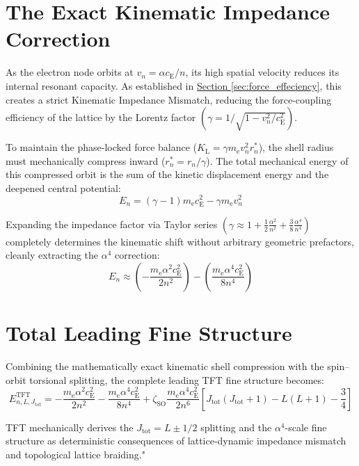 \section{The Exact Kinematic Impedance Correction}
As the electron node orbits at $v_n = \alpha c_{\mathrm{E}} / n$, its high spatial velocity reduces its internal resonant capacity. As established in \hyperref[sec:force_effeciency]{Section \ref*{sec:force_effeciency}}, this creates a strict Kinematic Impedance Mismatch, reducing the force-coupling efficiency of the lattice by the Lorentz factor $\left( \gamma = 1/\sqrt{1 - v_n^2/c_{\mathrm{E}}^2} \right)$. 

To maintain the phase-locked force balance ($K_{\mathrm{L}} = \gamma m_{\mathrm{e}} v_n^2 r_n^*$), the shell radius must mechanically compress inward ($r_n^* = r_n / \gamma$). The total mechanical energy of this compressed orbit is the sum of the kinetic displacement energy and the deepened central potential:
\begin{equation}
    E_n = (\gamma - 1)m_{\mathrm{e}} c_{\mathrm{E}}^2 - \gamma m_{\mathrm{e}} v_n^2
\end{equation}

Expanding the impedance factor via Taylor series $\left( \gamma \approx 1 + \frac{1}{2}\frac{\alpha^2}{n^2} + \frac{3}{8}\frac{\alpha^4}{n^4} \right)$ completely determines the kinematic shift without arbitrary geometric prefactors, cleanly extracting the $\alpha^4$ correction:
\begin{equation}
    E_n \approx \left( -\frac{m_{\mathrm{e}} \alpha^2 c_{\mathrm{E}}^2}{2n^2} \right) - \left( \frac{m_{\mathrm{e}} \alpha^4 c_{\mathrm{E}}^2}{8n^4} \right)
\end{equation}

\section{Total Leading Fine Structure}
Combining the mathematically exact kinematic shell compression with the spin--orbit torsional splitting, the complete leading TFT fine structure becomes:
\begin{equation}
    E_{n, L, J_{\mathrm{tot}}}^{\mathrm{TFT}} = -\frac{m_{\mathrm{e}} \alpha^2 c_{\mathrm{E}}^2}{2n^2} - \frac{m_{\mathrm{e}} \alpha^4 c_{\mathrm{E}}^2}{8n^4} + \zeta_{\mathrm{SO}} \frac{m_{\mathrm{e}} \alpha^4 c_{\mathrm{E}}^2}{2n^6} \left[ J_{\mathrm{tot}}(J_{\mathrm{tot}}+1) - L(L+1) - \frac{3}{4} \right]
\end{equation}

TFT mechanically derives the $J_{\mathrm{tot}} = L \pm 1/2$ splitting and the $\alpha^4$-scale fine structure as deterministic consequences of lattice-dynamic impedance mismatch and topological lattice braiding."
